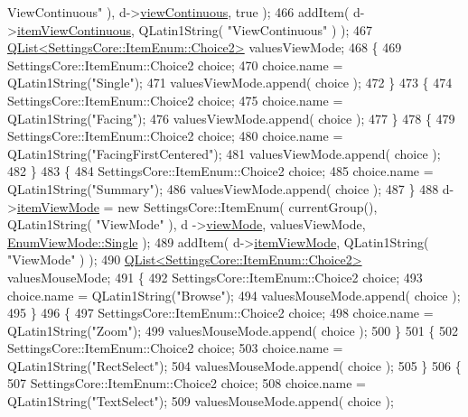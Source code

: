 \begin{DoxyCode}
{      ViewContinuous"} ), d->\hyperlink{classOkular_1_1SettingsPrivate_a105c4b8f8abe6b4543168f0cdc9629d2}{viewContinuous}, \textcolor{keyword}{true} );
466   addItem( d->\hyperlink{classOkular_1_1SettingsPrivate_a819238b76819053c13a29191b8766e21}{itemViewContinuous}, QLatin1String( \textcolor{stringliteral}{"ViewContinuous"} ) );
467   \hyperlink{classQList}{QList<SettingsCore::ItemEnum::Choice2>} valuesViewMode;
468   \{
469     SettingsCore::ItemEnum::Choice2 choice;
470     choice.name = QLatin1String(\textcolor{stringliteral}{"Single"});
471     valuesViewMode.append( choice );
472   \}
473   \{
474     SettingsCore::ItemEnum::Choice2 choice;
475     choice.name = QLatin1String(\textcolor{stringliteral}{"Facing"});
476     valuesViewMode.append( choice );
477   \}
478   \{
479     SettingsCore::ItemEnum::Choice2 choice;
480     choice.name = QLatin1String(\textcolor{stringliteral}{"FacingFirstCentered"});
481     valuesViewMode.append( choice );
482   \}
483   \{
484     SettingsCore::ItemEnum::Choice2 choice;
485     choice.name = QLatin1String(\textcolor{stringliteral}{"Summary"});
486     valuesViewMode.append( choice );
487   \}
488   d->\hyperlink{classOkular_1_1SettingsPrivate_a8a95244330e62699e739be887460a2ba}{itemViewMode} = \textcolor{keyword}{new} SettingsCore::ItemEnum( currentGroup(), QLatin1String( \textcolor{stringliteral}{"ViewMode"} ), d
      ->\hyperlink{classOkular_1_1SettingsPrivate_a1676716efb0c771777fbcdfc66800e11}{viewMode}, valuesViewMode, \hyperlink{classOkular_1_1Settings_1_1EnumViewMode_a33bc89b0f0c02bd5539bad916569a665a7ae89daa45516a7920bf5ee4f15c8d27}{EnumViewMode::Single} );
489   addItem( d->\hyperlink{classOkular_1_1SettingsPrivate_a8a95244330e62699e739be887460a2ba}{itemViewMode}, QLatin1String( \textcolor{stringliteral}{"ViewMode"} ) );
490   \hyperlink{classQList}{QList<SettingsCore::ItemEnum::Choice2>} valuesMouseMode;
491   \{
492     SettingsCore::ItemEnum::Choice2 choice;
493     choice.name = QLatin1String(\textcolor{stringliteral}{"Browse"});
494     valuesMouseMode.append( choice );
495   \}
496   \{
497     SettingsCore::ItemEnum::Choice2 choice;
498     choice.name = QLatin1String(\textcolor{stringliteral}{"Zoom"});
499     valuesMouseMode.append( choice );
500   \}
501   \{
502     SettingsCore::ItemEnum::Choice2 choice;
503     choice.name = QLatin1String(\textcolor{stringliteral}{"RectSelect"});
504     valuesMouseMode.append( choice );
505   \}
506   \{
507     SettingsCore::ItemEnum::Choice2 choice;
508     choice.name = QLatin1String(\textcolor{stringliteral}{"TextSelect"});
509     valuesMouseMode.append( choice );

\end{DoxyCode}
